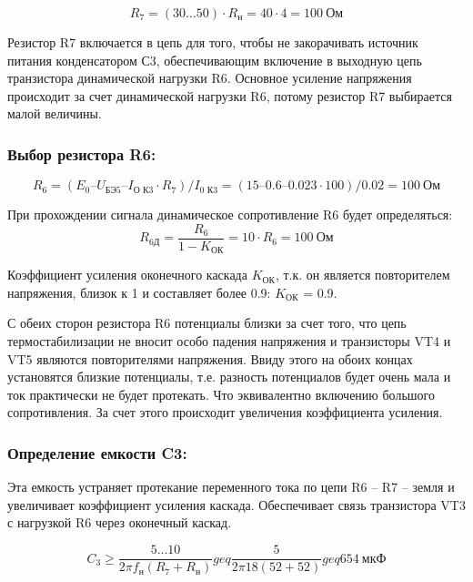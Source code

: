 \begin{equation}
\label{eq:equation3_2}
 R_{7} = (30\ldots 50)\cdot R_{н} = 40 \cdot 4 = 100~\text{Ом}
\end{equation}

Резистор R7 включается в цепь для того, чтобы не закорачивать источник питания конденсатором С3, обеспечивающим включение в выходную цепь транзистора динамической нагрузки R6. Основное усиление напряжения происходит за счет динамической нагрузки R6, потому резистор R7 выбирается малой величины.

\subsubsection{Выбор резистора R6:} 
\begin{equation}
\label{eq:equation3_2}
 R_{6} = (E_{0}– U_{\text{БЭ5}} – I_{\text{О К3}} \cdot R_7)/I_{\text{0 К3}} = (15 – 0.6 – 0.023 \cdot 100)/0.02 = 100~\text{Ом}
\end{equation}

При прохождении сигнала динамическое сопротивление R6 будет определяться:
\begin{equation}
\label{eq:equation3_3}
 R_{\text{6Д}} = \dfrac{R_6}{1-K_{\text{ОК}}} = 10 \cdot R_6 = 100~\text{Ом}
\end{equation}

Коэффициент усиления оконечного каскада $K_{\text{ОК}}$, т.к. он является повторителем напряжения, близок к 1 и составляет более 0.9: $K_{\text{ОК}}$ = 0.9. \par
С обеих сторон резистора R6 потенциалы близки за счет того, что цепь термостабилизации не вносит особо падения напряжения и транзисторы VT4 и VT5 являются повторителями напряжения. Ввиду этого на обоих концах установятся близкие потенциалы, т.е. разность потенциалов будет очень мала и ток практически не будет протекать. Что эквивалентно включению большого сопротивления. За счет этого происходит увеличения коэффициента усиления. \par

\subsubsection{Определение емкости C3:} 
Эта емкость устраняет протекание переменного тока по цепи R6 – R7 – земля и увеличивает коэффициент усиления каскада. Обеспечивает связь транзистора VT3 с нагрузкой R6 через оконечный каскад. \par
\begin{equation}
\label{eq:equation3_4}
 C_3 \geq \dfrac{5 \ldots 10}{2 \pi f_{\text{н}} (R_7 + R_{\text{н}})} geq \dfrac{5}{2 \pi 18 (52 + 52)} geq 654~\text{мкФ}
\end{equation}

